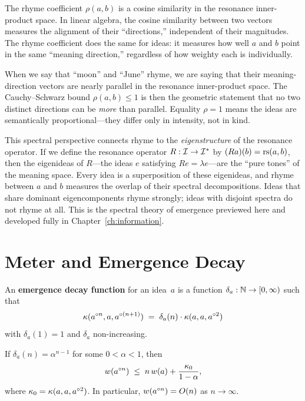 \begin{remark}
The rhyme coefficient $\rho(a,b)$ is a cosine similarity in the
resonance inner-product space.  In linear algebra, the cosine
similarity between two vectors measures the alignment of their
``directions,'' independent of their magnitudes.  The rhyme
coefficient does the same for ideas: it measures how well $a$ and
$b$ point in the same ``meaning direction,'' regardless of how
weighty each is individually.

When we say that ``moon'' and ``June'' rhyme, we are saying that
their meaning-direction vectors are nearly parallel in the
resonance inner-product space.  The Cauchy--Schwarz bound
$\rho(a,b) \le 1$ is then the geometric statement that no two
distinct directions can be \emph{more} than parallel.  Equality
$\rho = 1$ means the ideas are semantically proportional---they
differ only in intensity, not in kind.

This spectral perspective connects rhyme to the \emph{eigenstructure}
of the resonance operator.  If we define the resonance operator
$R : \mathcal{I} \to \mathcal{I}^*$ by $(Ra)(b) = \mathrm{rs}(a,b)$, then the eigenideas
of $R$---the ideas $e$ satisfying $Re = \lambda e$---are the
``pure tones'' of the meaning space.  Every idea is a superposition
of these eigenideas, and rhyme between $a$ and $b$ measures the
overlap of their spectral decompositions.  Ideas that share dominant
eigencomponents rhyme strongly; ideas with disjoint spectra do not
rhyme at all.  This is the spectral theory of emergence previewed
here and developed fully in Chapter~\ref{ch:information}.
\end{remark}

\section{Meter and Emergence Decay}
\label{sec:meter}

\begin{definition}
\label{def:emergence-decay}
An \textbf{emergence decay function} for an idea~$a$ is a function
$\delta_a : \mathbb{N} \to [0,\infty)$ such that
\[
  \kappa(a^{\circ n}, a, a^{\circ(n+1)})
  \;=\; \delta_a(n) \cdot \kappa(a,a,a^{\circ 2})
\]
with $\delta_a(1) = 1$ and $\delta_a$ non-increasing.
\end{definition}

\begin{theorem}
\label{thm:bounded-weight}
If $\delta_a(n) = \alpha^{n-1}$ for some $0 < \alpha < 1$, then
\[
  w(a^{\circ n})
  \;\le\; n\,w(a) + \frac{\kappa_0}{1-\alpha},
\]
where $\kappa_0 = \kappa(a,a,a^{\circ 2})$.  In particular,
$w(a^{\circ n}) = O(n)$ as $n \to \infty$.
\end{theorem}

